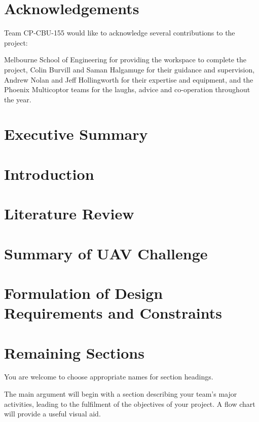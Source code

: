 \documentclass[]{article}
\begin{document}
\vfill
\vfill

\newpage

\section*{Acknowledgements}
Team CP-CBU-155 would like to acknowledge several contributions to the project:

Melbourne School of Engineering for providing the workspace to complete the project, Colin Burvill and Saman Halgamuge for their guidance and supervision, Andrew Nolan and Jeff Hollingworth for their expertise and equipment, and the Phoenix Multicoptor teams for the laughs, advice and co-operation throughout the year.



\newpage
\section{Executive Summary}


\section{Introduction}


\section{Literature Review}


\section{Summary of UAV Challenge}


\section{Formulation of Design Requirements and Constraints}


\section{Remaining Sections}
\color{red}
You are welcome to choose appropriate names for section headings.

The main argument will begin with a section describing your team’s major activities, leading to the fulfilment of the objectives of your project.  A flow chart will provide a useful visual aid.
\end{document}
